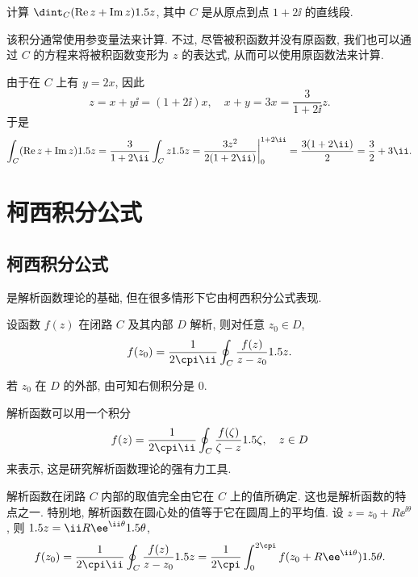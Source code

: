 \begin{example}
  计算 $\dint_C(\Re z+\Im z)\d z$, 其中 $C$ 是从原点到点 $1+2\ii$ 的直线段.
\end{example}

该积分通常使用参变量法来计算.
不过, 尽管被积函数并没有原函数, 我们也可以通过 $C$ 的方程来将被积函数变形为 $z$ 的表达式, 从而可以使用原函数法来计算.

\begin{solution}
  由于在 $C$ 上有 $y=2x$, 因此
  \[
    z=x+y\ii=(1+2\ii)x,\quad
    x+y=3x=\frac{3}{1+2\ii}z.
  \]
  于是
  \[
      \int_C(\Re z+\Im z)\d z
    =\frac{3}{1+2\ii}\int_C z\d z
    =\frac{3z^2}{2(1+2\ii)}\bigg|_0^{1+2\ii}
    =\frac{3(1+2\ii)}{2}
    =\frac32+3\ii.
  \]
\end{solution}



\section{柯西积分公式}

\subsection{柯西积分公式}

\thmCG 是解析函数理论的基础, 但在很多情形下它由柯西积分公式表现.

\begin{theorem}[柯西积分公式]
  \label{thm:Cauchy-integral}
  设函数 $f(z)$ 在闭路 $C$ 及其内部 $D$ 解析, 则对任意 $z_0\in D$,
  \[
    f(z_0)=\frac1{2\cpi\ii}\oint_C \frac{f(z)}{z-z_0}\d z.
  \]
\end{theorem}

若 $z_0$ 在 $D$ 的外部, 由\thmCG 可知右侧积分是 $0$.

解析函数可以用一个积分
\[
  f(z)=\frac1{2\cpi\ii}\oint_C \frac{f(\zeta)}{\zeta-z}\d\zeta,\quad z\in D
\]
来表示, 这是研究解析函数理论的强有力工具.

解析函数在闭路 $C$ 内部的取值完全由它在 $C$ 上的值所确定. 这也是解析函数的特点之一.
特别地, 解析函数在圆心处的值等于它在圆周上的平均值.
设 $z=z_0+R\ee^{\ii \theta}$, 则 $\d z=\ii R\ee^{\ii \theta}\d\theta$,
\[
  f(z_0)=\frac1{2\cpi\ii}\oint_C \frac{f(z)}{z-z_0}\d z=\frac1{2\cpi}\int_0^{2\cpi}f(z_0+R\ee^{\ii \theta})\d\theta.
\]


